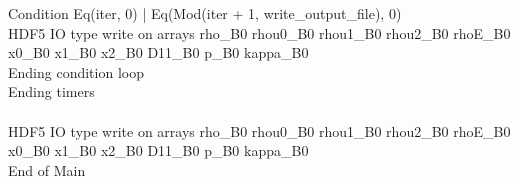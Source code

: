 \documentclass{article}
\begin{document}
\noindent Condition Eq(iter, 0) | Eq(Mod(iter + 1, write_output_file), 0)\\\noindent HDF5 IO type write on arrays rho_B0 rhou0_B0 rhou1_B0 rhou2_B0 rhoE_B0 x0_B0 x1_B0 x2_B0 D11_B0 p_B0 kappa_B0\\\noindent Ending condition loop %
\\\noindent Ending timers\\
\\\noindent HDF5 IO type write on arrays rho_B0 rhou0_B0 rhou1_B0 rhou2_B0 rhoE_B0 x0_B0 x1_B0 x2_B0 D11_B0 p_B0 kappa_B0\\\noindent End of Main\\
\end{document}
